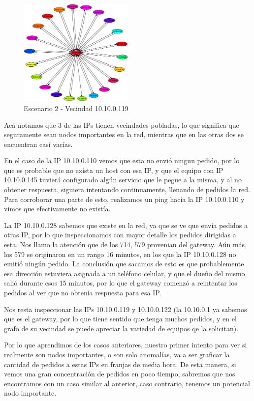    \begin{figure}[!ht]
		\centering
		\includegraphics[width=0.5\textwidth]{img/graph/escenario_2/vecindad119.eps}
		\caption{Escenario 2 - Vecindad 10.10.0.119}
		\label{fig:escenario2_vecindad119}
	\end{figure}
    Acá notamos que 3 de las IPs tienen vecindades pobladas, lo que significa que seguramente sean nodos importantes en la red, mientras que en las otras dos se encuentran casí vacías.
    \par En el caso de la IP 10.10.0.110 vemos que esta no envió ningun pedido, por lo que es probable que no exista un host con esa IP, y que el equipo con IP 10.10.0.145 tuvierá configurado algún servicio que le pegue a la misma, y al no obtener respuesta, siguiera intentando continuamente, llenando de pedidos la red. Para corroborar una parte de esto, realizamos un ping hacia la IP 10.10.0.110 y vimos que efectivamente no existía.
    \par La IP 10.10.0.128 sabemos que existe en la red, ya que se ve que envía pedidos a otras IP, por lo que inspeccionamos con mayor detalle los pedidos dirigidas a esta. Nos llamo la atención que de los 714, 579 provenian del gateway. Aún más, los 579 se originaron en un rango 16 minutos, en los que la IP 10.10.0.128 no emitió ningún pedido. La conclusión que sacamos de esto es que probablemente esa dirección estuviera asignada a un teléfono celular, y que el dueño del mismo salió durante esos 15 minutos, por lo que el gateway comenzó a reintentar los pedidos al ver que no obtenía respuesta para esa IP.
    \par Nos resta inspeccionar las IPs 10.10.0.119 y 10.10.0.122 (la 10.10.0.1 ya sabemos que es el gateway, por lo que tiene sentido que tenga muchos pedidos, y en el grafo de su vecindad se puede apreciar la variedad de equipos qe la solicitan). 
    \par Por lo que aprendimos de los casos anteriores, nuestro primer intento para ver si realmente son nodos importantes, o son solo anomalías, va a ser graficar la cantidad de pedidos a estas IPs en franjas de media hora. De esta manera, si vemos una gran concentración de pedidos en poco tiempo, sabremos que nos encontramos con un caso similar al anterior, caso contrario, tenemos un potencial nodo importante.
